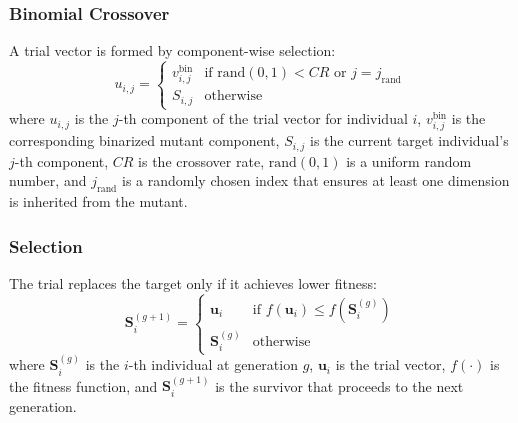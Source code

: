 \documentclass[journal]{IEEEtran}
\begin{document}
\subsubsection{Binomial Crossover} A trial vector is formed by component-wise selection:
\begin{equation}
    u_{i,j} = \begin{cases}
        v_{i,j}^{\text{bin}} & \text{if } \text{rand}(0,1) < CR \text{ or } j = j_{\text{rand}} \\
        S_{i,j} & \text{otherwise}
    \end{cases}
    \label{eq:crossover}
\end{equation}
where $u_{i,j}$ is the $j$-th component of the trial vector for individual $i$, $v_{i,j}^{\text{bin}}$ is the corresponding binarized mutant component, $S_{i,j}$ is the current target individual's $j$-th component, $CR$ is the crossover rate, $\text{rand}(0,1)$ is a uniform random number, and $j_{\text{rand}}$ is a randomly chosen index that ensures at least one dimension is inherited from the mutant.

\subsubsection{Selection} The trial replaces the target only if it achieves lower fitness:
\begin{equation}
    \mathbf{S}_i^{(g+1)} = \begin{cases}
        \mathbf{u}_i & \text{if } f(\mathbf{u}_i) \leq f(\mathbf{S}_i^{(g)}) \\
        \mathbf{S}_i^{(g)} & \text{otherwise}
    \end{cases}
    \label{eq:selection}
\end{equation}
where $\mathbf{S}_i^{(g)}$ is the $i$-th individual at generation $g$, $\mathbf{u}_i$ is the trial vector, $f(\cdot)$ is the fitness function, and $\mathbf{S}_i^{(g+1)}$ is the survivor that proceeds to the next generation.
\end{document}
